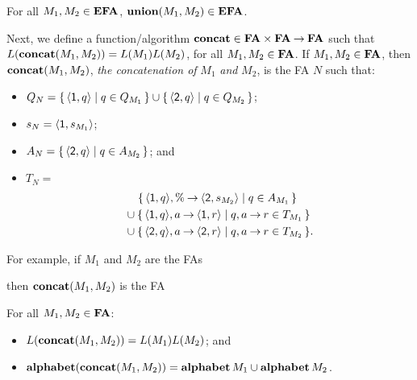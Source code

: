 \begin{proposition}
For all $M_1,M_2\in\mathbf{EFA}$, $\mathbf{union}(M_1,M_2)\in\mathbf{EFA}$.
\end{proposition}

%
%
%
%
Next, we define a function/algorithm $\mathbf{concat}\in\mathbf{FA}\times\mathbf{FA}\mathbin{\to}\mathbf{FA}$
such that $L(\mathbf{concat}(M_1,M_2))=L(M_1)L(M_2)$, for all
$M_1,M_2\in\mathbf{FA}$.  If $M_1,M_2\in\mathbf{FA}$, then $\mathbf{concat}(M_1,M_2)$, \emph{the
concatenation of} $M_1$ \emph{and} $M_2$, is the
FA $N$ such that:
\begin{itemize}
\item $Q_N=\{ \, \langle\mathsf{1},q\rangle \mid q\in Q_{M_1} \, \}\cup
\{ \, \langle\mathsf{2},q\rangle \mid q\in Q_{M_2} \, \}$;

\item $s_N=\langle\mathsf{1},s_{M_1}\rangle$;

\item $A_N=\{ \, \langle\mathsf{2},q\rangle \mid q\in
A_{M_2} \, \}$; and

\item $T_N={}$
  \begin{align*}
    &\quad\,
    \{ \, \langle\mathsf{1},q\rangle,\%\mathbin{\to}\langle\mathsf{2},s_{M_2}\rangle \mid q\in
      A_{M_1} \, \}
    \\
    &\cup
    \{ \, \langle\mathsf{1},q\rangle,a\mathbin{\to}\langle\mathsf{1},r\rangle \mid q,
      a\mathbin{\to} r\in T_{M_1} \, \}
    \\
    &\cup
    \{ \, \langle\mathsf{2},q\rangle,a\mathbin{\to}\langle\mathsf{2},r\rangle \mid q,
      a\mathbin{\to} r\in T_{M_2} \, \}.
  \end{align*}
\end{itemize}

For example, if $M_1$ and $M_2$ are the FAs
\begin{center}


\end{center}
then $\mathbf{concat}(M_1,M_2)$ is the FA
\begin{center}

\end{center}

\begin{proposition}
For all $M_1,M_2\in\mathbf{FA}$:
\begin{itemize}
\item $L(\mathbf{concat}(M_1,M_2))=L(M_1)L(M_2)$; and

\item $\mathbf{alphabet}(\mathbf{concat}(M_1,M_2))=\mathbf{alphabet}\,M_1\cup\mathbf{alphabet}\,M_2$.
\end{itemize}
\end{proposition}

